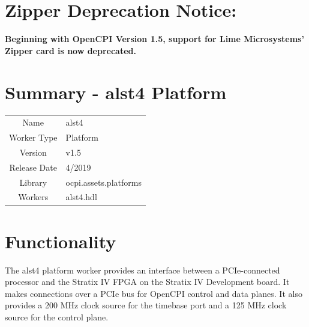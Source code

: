 \documentclass{article}
\author{} %
\date{Version \docVersion} %
\title{\docTitle}
\def\docVersion{1.5}
\def\comp{alst4}
\def\Comp{alst4 Platform}
\begin{document}
\section*{Zipper Deprecation Notice:}
\textbf{Beginning with OpenCPI Version 1.5, support for Lime Microsystems' Zipper card is now deprecated.}

\section*{Summary - \Comp}
\begin{tabular}{|c|M{13.5cm}|}
	\hline
	                  & \\
	\hline
	Name              & \comp \\
	\hline
	Worker Type       & Platform \\
	\hline
	Version           & v\docVersion \\
	\hline
	Release Date      & 4/2019 \\
	\hline
	Library & ocpi.assets.platforms \\
	\hline
	Workers & \comp.hdl \\
	\hline
\end{tabular}

\section*{Functionality}
\begin{flushleft}
The alst4 platform worker provides an interface between a PCIe-connected processor and the Stratix IV FPGA on the Stratix IV Development board. It makes connections over a PCIe bus for OpenCPI control and data planes. It also provides a 200 MHz clock source for the timebase port and a 125 MHz clock source for the control plane.
\end{flushleft}
\end{document}
